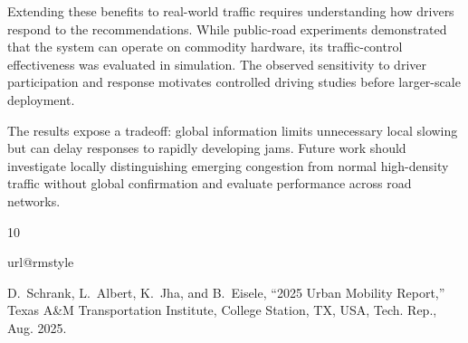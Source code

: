 \documentclass[letterpaper, 10pt, journal, twoside]{IEEEtran}
\begin{document}
Extending these benefits to real-world traffic requires understanding how drivers respond to the recommendations. While public-road experiments demonstrated that the system can operate on commodity hardware, its traffic-control effectiveness was evaluated in simulation. The observed sensitivity to driver participation and response motivates controlled driving studies before larger-scale deployment.

The results expose a tradeoff: global information limits unnecessary local slowing but can delay responses to rapidly developing jams. Future work should investigate locally distinguishing emerging congestion from normal high-density traffic without global confirmation and evaluate performance across road networks.

\begin{thebibliography}{10}


\providecommand{\url}[1]{#1}

\csname url@rmstyle\endcsname

\providecommand{\newblock}{\relax}

\providecommand{\bibinfo}[2]{#2}

\providecommand\BIBentrySTDinterwordspacing{\spaceskip=0pt\relax}

\providecommand\BIBentryALTinterwordstretchfactor{4}

\providecommand\BIBentryALTinterwordspacing{\spaceskip=\fontdimen2\font plus

\BIBentryALTinterwordstretchfactor\fontdimen3\font minus

  \fontdimen4\font\relax}

\providecommand\BIBforeignlanguage[2]{{%

\expandafter\ifx\csname l@#1\endcsname\relax

\typeout{** WARNING: IEEEtran.bst: No hyphenation pattern has been}%

\typeout{** loaded for the language `#1'. Using the pattern for}%

\typeout{** the default language instead.}%

\else

\language=\csname l@#1\endcsname

\fi

#2}}

D.~Schrank, L.~Albert, K.~Jha, and B.~Eisele, ``{2025 Urban Mobility Report},'' Texas A\&M Transportation Institute, College Station, TX, USA, Tech. Rep., Aug. 2025.


\end{thebibliography}
\end{document}
